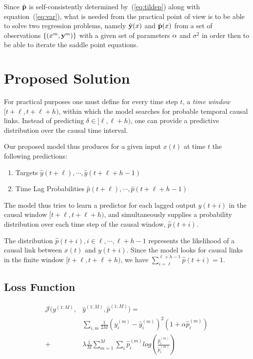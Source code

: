 \documentclass[envcountsect,runningheads]{llncs}
\theoremstyle{etoile}
\begin{document}
Since $\hat {\bf p}$ is self-consistently determined by~(\ref{eq:tildep}) along with equation~(\ref{eq:var}), what is needed from the practical point of view is to be able
to solve two  regression problems, namely $\hat {\bf y}(x)$ and $\hat {\bf p}(x)$ from a set of observations $\{(x^{m},{\bf y}^{m})\}$ with a given set of parameters ${\bf \alpha}$
and $\sigma^2$ in order then to be able to iterate the saddle point equations.


\section{Proposed Solution}\label{sec:model}

For practical purposes one must define for every time step $t$, a \emph{time window} 
$[t+\ell, t+\ell+h)$, within which the model searches for probable temporal causal links. 
Instead of predicting $\delta \in [\ell, \ell+h)$, one can provide a predictive distribution 
over the causal time interval.

Our proposed model thus produces for a given input $x(t)$ at time $t$ the following predictions:

\begin{enumerate}
\item Targets $\hat{y}(t+\ell), \cdots, \hat{y}(t+\ell+h-1)$
\item Time Lag Probabilities $\hat{p}(t+\ell), \cdots, \hat{p}(t+\ell+h-1)$
\end{enumerate}

The model thus tries to learn a predictor for each lagged output $y(t+i)$ in the causal window 
$[t+\ell, t+\ell+h)$, and simultaneously supplies a probability distribution over each time step 
of the causal window, $\hat{p}(t+i)$.

The distribution $\hat{p}(t+i), i \in {\ell, \cdots, \ell+h-1}$ represents the 
likelihood of a causal link between $x(t)$ and $y(t+i)$. Since the model looks
for causal links in the finite window $[t+\ell, t+\ell+h)$, we have 
$\sum^{\ell+h-1}_{i = \ell}{\hat{p}(t + i)} = 1$.


\subsection{Loss Function}

\begin{equation}\label{eq:loss}
\begin{aligned}
\mathcal{J}(y^{(1:M)}, &\hat{y}^{(1:M)}, \hat{p}^{(1:M)}) =\\ 
& \sum_{i,m}{\frac{1}{2M} (y^{(m)}_{i} - \hat{y}^{(m)}_{i})^2 (1 + \alpha \hat{p}^{(m)}_i)} \\ 
+ &\lambda \frac{1}{M} \sum_{m = 1}^{M}{\sum_{i}{\hat{p}^{(m)}_{i}log \left (\frac{\hat{p}^{(m)}_i}{\tilde{p}^{(m)}_i} \right)}}
\end{aligned}
\end{equation}
      
\end{document}
